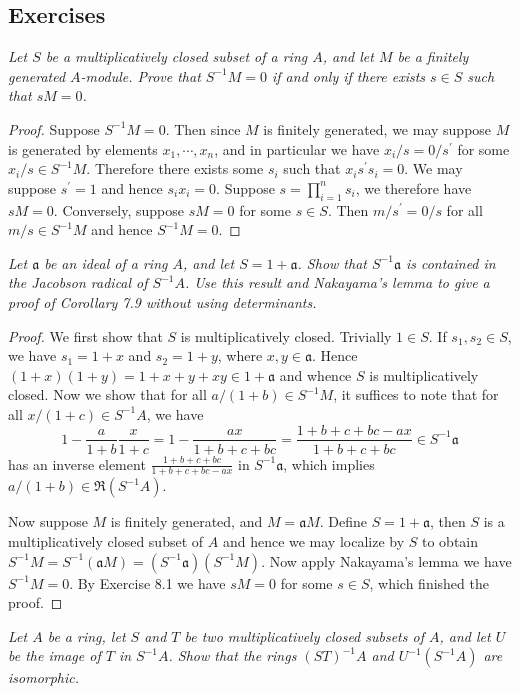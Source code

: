 \subsection{Exercises}
\begin{problem}\em
Let $S$ be a multiplicatively closed subset of a ring $A$, and let $M$ be a finitely generated $A$-module. Prove that $S^{-1}M=0$ if and only if there exists $s\in S$ such that $sM=0$.
\end{problem}
\begin{proof}
Suppose $S^{-1}M=0$. Then since $M$ is finitely generated, we may suppose $M$ is generated by elements $x_1,\cdots,x_n$, and in particular we have $x_i/s=0/s^\prime$ for some $x_i/s\in S^{-1}M$. Therefore there exists some $s_i$ such that $x_is^\prime s_i=0$. We may suppose $s^\prime=1$ and hence $s_ix_i=0$. Suppose $s=\prod_{i=1}^ns_i$, we therefore have $sM=0$. Conversely, suppose $sM=0$ for some $s\in S$. Then $m/s^\prime=0/s$ for all $m/s\in S^{-1}M$ and hence $S^{-1}M=0$.
\end{proof}
\begin{problem}\em
Let $\mathfrak{a}$ be an ideal of a ring $A$, and let $S=1+\mathfrak{a}$. Show that $S^{-1}\mathfrak{a}$ is contained in the Jacobson radical of $S^{-1}A$. Use this result and Nakayama's lemma to give a proof of Corollary 7.9 without using determinants.
\end{problem}
\begin{proof}
We first show that $S$ is multiplicatively closed. Trivially $1\in S$. If $s_1,s_2\in S$, we have $s_1=1+x$ and $s_2=1+y$, where $x,y\in\mathfrak{a}$. Hence $(1+x)(1+y)=1+x+y+xy\in 1+\mathfrak{a}$ and whence $S$ is multiplicatively closed. Now we show that for all $a/(1+b)\in S^{-1}M$, it suffices to note that for all $x/(1+c)\in S^{-1}A$, we have 
$$
1-\frac{a}{1+b}\frac{x}{1+c}=1-\frac{ax}{1+b+c+bc}=\frac{1+b+c+bc-ax}{1+b+c+bc}\in S^{-1}\mathfrak{a} 
$$
has an inverse element $\frac{1+b+c+bc}{1+b+c+bc-ax}$ in $S^{-1}\mathfrak{a}$, which implies $a/(1+b)\in\mathfrak{R}(S^{-1}A)$.\par
Now suppose $M$ is finitely generated, and $M=\mathfrak{a}M$. Define $S=1+\mathfrak{a}$, then $S$ is a multiplicatively closed subset of $A$ and hence we may localize by $S$ to obtain $S^{-1}M=S^{-1}(\mathfrak{a}M)=(S^{-1}\mathfrak{a})(S^{-1}M)$. Now apply Nakayama's lemma we have $S^{-1}M=0$. By Exercise 8.1 we have $sM=0$ for some $s\in S$, which finished the proof.
\end{proof}
\begin{problem}\em
Let $A$ be a ring, let $S$ and $T$ be two multiplicatively closed subsets of $A$, and let $U$ be the image of $T$ in $S^{-1}A$. Show that the rings $(ST)^{-1}A$ and $U^{-1}(S^{-1}A)$ are isomorphic.
\end{problem}
